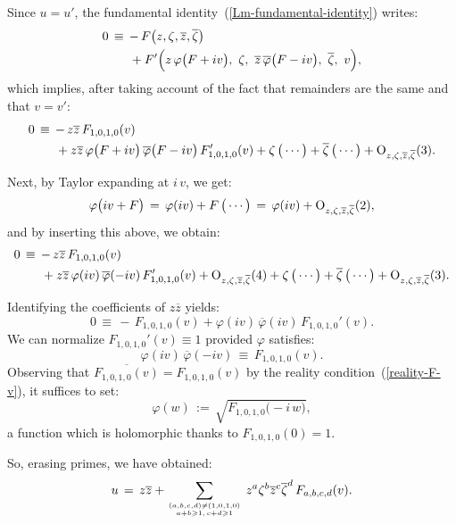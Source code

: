 \documentclass[12pt,twoside,leqno,openany]{amsart}
\begin{document}
Since $u = u'$, the fundamental 
identity~({\ref{Lm-fundamental-identity}}) writes:
\[
\aligned
0
&
\,\equiv\,
-\,F\big(z,\zeta,\overline{z},\overline{\zeta}\big)
\\
&
\ \ \ \ \
+
F'
\Big(
z\,\varphi\big(F+iv\big),\,\,
\zeta,\,\,
\overline{z}\,\overline{\varphi}\big(F-iv\big),\,\,
\overline{\zeta},\,\,v
\Big),
\endaligned
\]
which implies, after taking account of the fact that remainders
are the same and that $v = v'$:
\[
\aligned
0
&
\,\equiv\,
-\,z\overline{z}\,F_{1,0,1,0}(v)
\\
&
\ \ \ \ \
+
z\overline{z}\,
\varphi\big(F+iv\big)\,
\overline{\varphi}\big(F-iv\big)\,
F_{1,0,1,0}'(v)
+
\zeta\,\big(\cdots\big)
+
\overline{\zeta}\,\big(\cdots\big)
+
{\rm O}_{z,\zeta,\overline{z},\overline{\zeta}}(3).
\endaligned
\]

Next, by Taylor expanding at $i\,v$, we get:
\[
\varphi\big(iv+F\big)
\,=\,
\varphi(iv)
+
F\,\big(\cdots\big)
\,=\,
\varphi(iv)
+
{\rm O}_{z,\zeta,\overline{z},\overline{\zeta}}(2),
\]
and by inserting this above, we obtain:
\[
\aligned
0
&
\,\equiv\,
-\,z\overline{z}\,F_{1,0,1,0}(v)
\\
&
\ \ \ \ \
+
z\overline{z}\,
\varphi(iv)\,\overline{\varphi}(-iv)\,
F_{1,0,1,0}'(v)
+
{\rm O}_{z,\zeta,\overline{z},\overline{\zeta}}(4)
+
\zeta\,\big(\cdots\big)
+
\overline{\zeta}\,\big(\cdots\big)
+
{\rm O}_{z,\zeta,\overline{z},\overline{\zeta}}(3).
\endaligned
\]

Identifying the coefficients of $z\overline{z}$ yields:
\[
0
\,\equiv\,
-\,F_{1,0,1,0}(v)
+
\varphi(iv)\,\overline{\varphi}(iv)\,
F_{1,0,1,0}'(v).
\]
We can normalize $F_{1,0,1,0}'(v) \equiv 1$ provided
$\varphi$ satisfies:
\[
\varphi(iv)\,\overline{\varphi}(-iv)
\,\equiv\,
F_{1,0,1,0}(v).
\]
Observing that $\overline{F_{1,0,1,0}(v)} = F_{1,0,1,0}(v)$ 
by the reality condition~({\ref{reality-F-v}}),
it suffices to set:
\[
\varphi(w)
\,:=\,
\sqrt{
F_{1,0,1,0}\big(-i\,w\big)},
\]
a function which is holomorphic thanks to $F_{1,0,1,0}(0) = 1$.
\endproof

So, erasing primes, we have obtained:
\leqnomode{}
\begin{align}
\label{normalization-end-step-I}
u
\,=\,
z\overline{z}
+
\sum_{(a,b,c,d)\neq(1,0,1,0)
\atop
a+b\geqslant 1,\,c+d\geqslant 1}\,
z^a\zeta^b\overline{z}^c\overline{\zeta}^d\,
F_{a,b,c,d}(v).
\end{align}

\label{dependent-jets-independent-jets}
\end{document}
